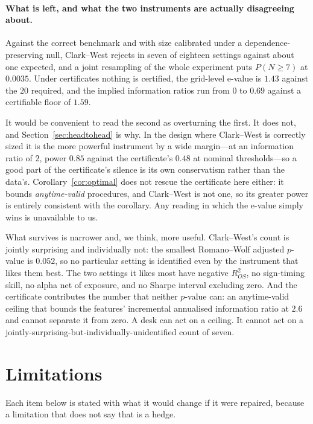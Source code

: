 \documentclass{article}
\theoremstyle{plain}
\theoremstyle{definition}
\newcommand{\rsq}{R^2_{OS}}
\begin{document}
\paragraph{What is left, and what the two instruments are actually disagreeing about.}
Against the correct benchmark and with size calibrated under a dependence-preserving null,
Clark--West rejects in seven of eighteen settings against about one expected, and a joint
resampling of the whole experiment puts $P(N\ge7)$ at $0.0035$. Under certificates nothing is
certified, the grid-level e-value is $1.43$ against the $20$ required, and the implied
information ratios run from $0$ to $0.69$ against a certifiable floor of $1.59$.

It would be convenient to read the second as overturning the first. It does not, and
Section~\ref{sec:headtohead} is why. In the design where Clark--West is correctly sized it is
the more powerful instrument by a wide margin---at an information ratio of $2$, power $0.85$
against the certificate's $0.48$ at nominal thresholds---so a good part of the certificate's
silence is its own conservatism rather than the data's. Corollary~\ref{cor:optimal} does not
rescue the certificate here either: it bounds \emph{anytime-valid} procedures, and Clark--West
is not one, so its greater power is entirely consistent with the corollary. Any reading in
which the e-value simply wins is unavailable to us.

What survives is narrower and, we think, more useful. Clark--West's count is jointly
surprising and individually not: the smallest Romano--Wolf adjusted $p$-value is $0.052$, so
no particular setting is identified even by the instrument that likes them best. The two
settings it likes most have negative $\rsq$, no sign-timing skill, no alpha net of exposure,
and no Sharpe interval excluding zero. And the certificate contributes the number that neither
$p$-value can: an anytime-valid ceiling that bounds the features' incremental annualised
information ratio at $2.6$ and cannot separate it from zero. A desk can act on a ceiling. It
cannot act on a jointly-surprising-but-individually-unidentified count of seven.

\section{Limitations}
\label{sec:limitations}

Each item below is stated with what it would change if it were repaired, because a
limitation that does not say that is a hedge.
\end{document}
